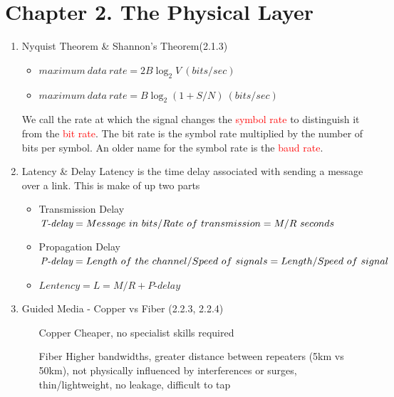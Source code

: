 \documentclass[a4paper,10pt]{article}
\newcommand{\red}[1]{\textcolor{red}{#1}}
\begin{document}
\newpage\section*{Chapter 2. The Physical Layer}
\begin{enumerate}
  \item Nyquist Theorem \& Shannon's Theorem(2.1.3)
    \begin{itemize}
      \item $ maximum\ data\ rate = 2B\log_2 V\ (bits/sec) $
      \item $ maximum\ data\ rate = B\log_2 (1+S/N)\ (bits/sec) $
    \end{itemize}
    We call the rate at which the signal changes the \red{symbol rate} to distinguish it from the \red{bit rate}. The bit rate is the symbol rate multiplied by the number of bits per symbol. An older name for the symbol rate is the \red{baud rate}.
  
  \item Latency \& Delay
    \newline Latency is the time delay associated with sending a message over a link.
    \newline This is make of up two parts
    \begin{itemize}
      \item Transmission Delay
        \newline $ \textit{T-delay} = Message\ in\ bits/Rate\ of\ transmission \\= M/R\ seconds $
      \item Propagation Delay
        \newline $ \textit{P-delay} = Length\ of\ the\ channel/Speed\ of\ signals \\= Length/Speed\ of\ signal $
      \item $ Lentency = L = M/R + \textit{P-delay} $
    \end{itemize}
    
  \item Guided Media - Copper vs Fiber (2.2.3, 2.2.4)
    \begin{itemize}
      \item [Copper] Cheaper, no specialist skills required
      \item [Fiber] Higher bandwidths, greater distance between repeaters (5km vs 50km), not physically influenced by interferences or surges, thin/lightweight, no leakage, difficult to tap
    \end{itemize}
\end{enumerate}
\end{document}
